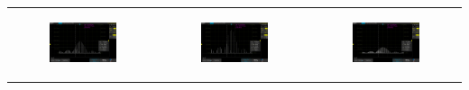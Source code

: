 \documentclass[a4paper,12pt]{article} %
\begin{document}
\begin{table}[ht]
\begin{tabular}{ccc}
\begin{subfigure}{0.3\textwidth}\centering\includegraphics[width=\columnwidth]{II/AKIP0012.png}\end{subfigure} &
\begin{subfigure}{0.3\textwidth}\centering\includegraphics[width=\columnwidth]{II/AKIP0013.png}\end{subfigure} &
\begin{subfigure}{0.3\textwidth}\centering\includegraphics[width=\columnwidth]{II/AKIP0014.png}\end{subfigure} \\

\end{tabular}
\end{table}
\end{document}
